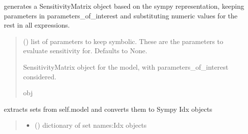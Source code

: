 \documentclass[letterpaper,10pt,english]{sphinxmanual}
\begin{document}
\begin{fulllineitems}
\begin{fulllineitems}
\begin{quote}
\begin{description}
\end{description}\end{quote}

\end{fulllineitems}


\begin{fulllineitems}
\label{\detokenize{src.sensitivity.sensitivity_tools:src.sensitivity.sensitivity_tools.AutoSympy.get_sensitivity_matrix}}
\pysigstartsignatures
\pysiglinewithargsret
{}
{}
{}
\pysigstopsignatures
\sphinxAtStartPar
generates a SensitivityMatrix object based on the sympy representation, keeping parameters in parameters\_of\_interest
and substituting numeric values for the rest in all expressions.
\begin{quote}\begin{description}
\sphinxAtStartPar
{} (\sphinxstyleliteralemphasis{\sphinxupquote{, }}) \textendash{} list of parameters to keep symbolic. These are the parameters to evaluate sensitivity for. Defaults to None.

\sphinxAtStartPar
SensitivityMatrix object for the model, with parameters\_of\_interest considered.

\sphinxAtStartPar
obj

\end{description}\end{quote}

\end{fulllineitems}


\begin{fulllineitems}
\label{\detokenize{src.sensitivity.sensitivity_tools:src.sensitivity.sensitivity_tools.AutoSympy.get_sets}}
\pysigstartsignatures
\pysiglinewithargsret
{}
{}
{}
\pysigstopsignatures
\sphinxAtStartPar
extracts sets from self.model and converts them to Sympy Idx objects
\begin{quote}\begin{description}
\sphinxAtStartPar
\begin{itemize}
\item {} 
\sphinxAtStartPar
{} () \textendash{} dictionary of set names:Idx objects


\end{itemize}
\end{description}
\end{quote}
\end{fulllineitems}
\end{fulllineitems}
\end{document}
